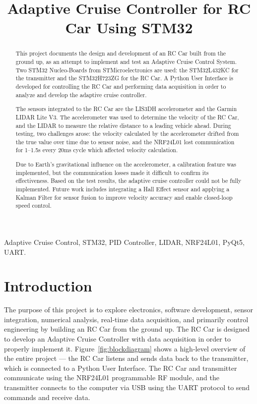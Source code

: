 \documentclass[conference]{IEEEtran}
\title{Adaptive Cruise Controller for RC Car Using STM32}
\author{
	\IEEEauthorblockN{Erickson A.\ Mijangos}
	\IEEEauthorblockA{Department of Electrical Engineering\\
		California State University Fullerton, Fullerton, California\\
		eamijangos@csu.fullerton.edu}
	\and
	\IEEEauthorblockN{Dr.\ Mike Turi}
	\IEEEauthorblockA{Department of Electrical Engineering\\
		California State University Fullerton, Fullerton, California\\
		mturi@fullerton.edu}
}
\begin{document}
	\maketitle
	
	\begin{abstract}
		This project documents the design and development of an RC Car built from the 
		ground up, as an attempt to implement and test an Adaptive Cruise Control 
		System. Two STM32 Nucleo-Boards from STMicroelectronics are used: the 
		STM32L432KC for the transmitter and the STM32H723ZG for the RC Car. A Python 
		User Interface is developed for controlling the RC Car and performing data 
		acquisition in order to analyze and develop the adaptive cruise controller.
		
		The sensors integrated to the RC Car are the LIS3DH accelerometer and the 
		Garmin LIDAR Lite V3. The accelerometer was used to determine the velocity of 
		the RC Car, and the LIDAR to measure the relative distance to a leading vehicle 
		ahead. During testing, two challenges arose: the velocity calculated by the 
		accelerometer drifted from the true value over time due to sensor noise, and the 
		NRF24L01 lost communication for 1--1.5s every 20ms cycle which affected velocity 
		calculation.
		
		Due to Earth's gravitational influence on the accelerometer, a calibration 
		feature was implemented, but the communication losses made it difficult to 
		confirm its effectiveness. Based on the test results, the adaptive cruise 
		controller could not be fully implemented. Future work includes integrating a 
		Hall Effect sensor and applying a Kalman Filter for sensor fusion to improve 
		velocity accuracy and enable closed-loop speed control.
	\end{abstract}
	
	\begin{IEEEkeywords}
		Adaptive Cruise Control, STM32, PID Controller, LIDAR, NRF24L01, PyQt5, UART.
	\end{IEEEkeywords}
	
	\section{Introduction}
	\label{sec:intro}
	
	The purpose of this project is to explore electronics, software development,
	sensor integration, numerical analysis, real-time data acquisition, and
	primarily control engineering by building an RC Car from the ground up.
	The RC Car is designed to develop an Adaptive Cruise Controller with data
	acquisition in order to properly implement it. Figure~\ref{fig:blockdiagram}
	shows a high-level overview of the entire project — the RC Car listens and
	sends data back to the transmitter, which is connected to a Python User
	Interface. The RC Car and transmitter communicate using the NRF24L01
	programmable RF module, and the transmitter connects to the computer via USB
	using the UART protocol to send commands and receive data.
	
\end{document}
